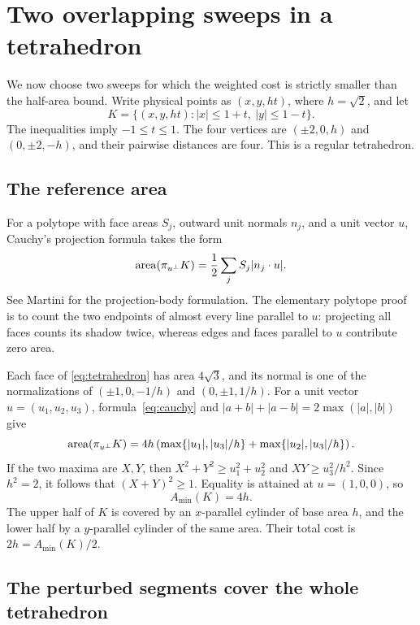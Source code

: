\section{Two overlapping sweeps in a tetrahedron}
\label{sec:tetrahedron}

We now choose two sweeps for which the weighted cost is strictly
smaller than the half-area bound. Write physical points as
$(x,y,ht)$, where $h=\sqrt2$, and let
\begin{equation}\label{eq:tetrahedron}
 K=\{(x,y,ht):|x|\le1+t,\ |y|\le1-t\}.
\end{equation}
The inequalities imply $-1\le t\le1$. The four vertices are
$(\pm2,0,h)$ and $(0,\pm2,-h)$, and their pairwise distances
are four. This is a regular tetrahedron.

\subsection{The reference area}

For a polytope with face areas $S_j$, outward unit normals $n_j$,
and a unit vector $u$, Cauchy's projection formula takes the form
\begin{equation}\label{eq:cauchy}
 \operatorname{area}(\pi_{u^\perp}K)=\frac12\sum_j S_j|n_j\cdot u|.
\end{equation}
See Martini \cite[p.~83, equation~(1)]{Martini1991} for the
projection-body formulation. The elementary polytope proof is to
count the two endpoints of almost every line parallel to $u$:
projecting all faces counts its shadow twice, whereas edges and
faces parallel to $u$ contribute zero area.

Each face of \eqref{eq:tetrahedron} has area $4\sqrt3$, and its
normal is one of the normalizations of
$(\pm1,0,-1/h)$ and $(0,\pm1,1/h)$.
For a unit vector $u=(u_1,u_2,u_3)$, formula~\eqref{eq:cauchy}
and $|a+b|+|a-b|=2\max(|a|,|b|)$ give
\[
 \operatorname{area}(\pi_{u^\perp}K)
 =4h\left(\max\{|u_1|,|u_3|/h\}
          +\max\{|u_2|,|u_3|/h\}\right).
\]
If the two maxima are $X,Y$, then
$X^2+Y^2\ge u_1^2+u_2^2$ and $XY\ge u_3^2/h^2$.
Since $h^2=2$, it follows that $(X+Y)^2\ge1$.
Equality is attained at $u=(1,0,0)$, so
\begin{equation}\label{eq:min-area}
 A_{\min}(K)=4h.
\end{equation}
The upper half of $K$ is covered by an $x$-parallel cylinder of
base area $h$, and the lower half by a $y$-parallel cylinder of
the same area. Their total cost is $2h=A_{\min}(K)/2$.

\subsection{The perturbed segments cover the whole tetrahedron}

